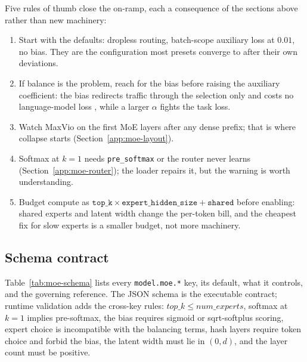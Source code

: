 Five rules of thumb close the on-ramp, each a consequence of the sections
above rather than new machinery:
\begin{enumerate}[leftmargin=1.4em]
  \item Start with the defaults: dropless routing, batch-scope auxiliary
        loss at $0.01$, no bias. They are the configuration most presets
        converge to after their own deviations.
  \item If balance is the problem, reach for the bias before raising the
        auxiliary coefficient: the bias redirects traffic through the
        selection only and costs no language-model loss
        \citep{wang2024auxfree}, while a larger $\alpha$ fights the task
        loss.
  \item Watch MaxVio on the first MoE layers after any dense prefix; that is
        where collapse starts (Section~\ref{app:moe-layout}).
  \item Softmax at $k{=}1$ needs \texttt{pre\_softmax} or the router never
        learns (Section~\ref{app:moe-router}); the loader repairs it, but
        the warning is worth understanding.
  \item Budget compute as $\texttt{top\_k} \times \texttt{expert\_hidden\_size}
        + \texttt{shared}$ before enabling: shared experts and latent width
        change the per-token bill, and the cheapest fix for slow experts is
        a smaller budget, not more machinery.
\end{enumerate}

\subsection{Schema contract}
\label{app:moe-schema}

Table~\ref{tab:moe-schema} lists every \texttt{model.moe.*} key, its
default, what it controls, and the governing reference. The JSON schema is
the executable contract; runtime validation adds the cross-key rules:
$top\_k \leqslant num\_experts$, softmax at $k=1$ implies pre-softmax, the
bias requires sigmoid or sqrt-softplus scoring, expert choice is
incompatible with the balancing terms, hash layers require token choice and
forbid the bias, the latent width must lie in $(0, d)$, and the layer count
must be positive.


